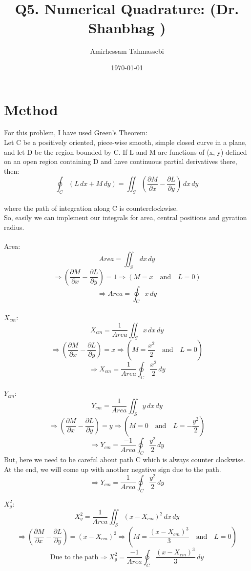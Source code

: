 \documentclass[a4paper]{article}
\title{Q5. Numerical Quadrature: (Dr. Shanbhag )}
\author{Amirhessam Tahmassebi}
\date{\today}
\begin{document}
\maketitle



\section{Method}

For this problem, I have used Green's Theorem:\\
Let C be a positively oriented, piece-wise smooth, simple closed curve in a plane, and let D be the region bounded by C. If L and M are functions of (x, y) defined on an open region containing D and have continuous partial derivatives there, then:\\

$$\oint_C (L\,dx + M\,dy) = \iint_S (\frac{\partial M}{\partial x}-\frac{\partial L}{\partial y}) \,dx\,dy$$\\
where the path of integration along C is counterclockwise.\\

So, easily we can implement our integrals for area, central positions and gyration radius. \\\\
Area:
$$Area = \iint_S  \,dx\,dy$$
$$\Longrightarrow (\frac{\partial M}{\partial x}-\frac{\partial L}{\partial y}) = 1 \Longrightarrow (M=x \quad \textrm{and} \quad L=0 )$$ 
$$\Longrightarrow Area = \oint_C  x\,dy $$\\

$X_{cm}$:
$$X_{cm} =\frac{1}{Area}\iint_S x \,dx\,dy$$
$$\Longrightarrow (\frac{\partial M}{\partial x}-\frac{\partial L}{\partial y}) = x \Longrightarrow (M=\frac{x^2}{2} \quad \textrm{and} \quad L=0 )$$ 
$$\Longrightarrow X_{cm} = \frac{1}{Area}\oint_C  \frac{x^2}{2}\,dy $$\\


$Y_{cm}$:
$$Y_{cm} =\frac{1}{Area}\iint_S y \,dx\,dy$$
$$\Longrightarrow (\frac{\partial M}{\partial x}-\frac{\partial L}{\partial y}) = y \Longrightarrow (M=0 \quad \textrm{and} \quad L=-\frac{y^2}{2} )$$ 
$$\Longrightarrow Y_{cm} = \frac{-1}{Area}\oint_C  \frac{y^2}{2}\,dy $$
But, here we need to be careful about path C which is always counter clockwise. At the end, we will come up with another negative sign due to the path.
$$\Longrightarrow Y_{cm} = \frac{1}{Area}\oint_C  \frac{y^2}{2}\,dy $$

$X_{g}^2$:
$$X_{g}^2 =\frac{1}{Area}\iint_S (x-X_{cm})^2 \,dx\,dy$$
$$\Longrightarrow (\frac{\partial M}{\partial x}-\frac{\partial L}{\partial y}) = (x-X_{cm})^2 \Longrightarrow (M=\frac{(x-X_{cm})^3}{3} \quad \textrm{and} \quad L=0 )$$ 
$$\textrm{Due to the path}\Longrightarrow X_{g}^2 = \frac{-1}{Area}\oint_C  \frac{(x-X_{cm})^3}{3}\,dy $$\\
\end{document}
